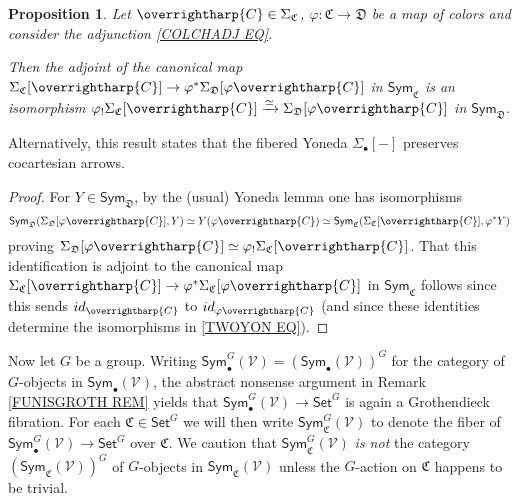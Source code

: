\documentclass[a4paper,10pt
,draft
]{article}%
\numberwithin{equation}{section}
\numberwithin{figure}{section}
\newtheorem{proposition}[equation]{Proposition}%
\theoremstyle{definition} %
\newcommand{\vect}[1]{\text{\overrightharp{\ensuremath{#1}}}}
\newcommand{\V}{\ensuremath{\mathcal V}}
\newcommand{\1}{\ensuremath{\mathbbm 1}}%
\begin{document}
\begin{proposition}\label{FIBYONPUSH PROP}
Let $\vect{C} \in \Sigma_{\mathfrak{C}}$,
$\varphi \colon \mathfrak{C} \to \mathfrak{D}$
be a map of colors and consider the adjunction \eqref{COLCHADJ EQ}.

Then the adjoint of the canonical map
$\Sigma_{\mathfrak{C}}[\vect{C}]
\to
\varphi^{\**}\Sigma_{\mathfrak{D}}[\varphi\vect{C}]$
in $\mathsf{Sym}_{\mathfrak{C}}$
is an isomorphism
$\varphi_{!} \Sigma_{\mathfrak{C}}[\vect{C}]
\xrightarrow{\simeq}
\Sigma_{\mathfrak{D}}[\varphi\vect{C}]$
in $\mathsf{Sym}_{\mathfrak{D}}$.
\end{proposition}


Alternatively, this result states that 
the fibered Yoneda $\Sigma_{\bullet}[-]$
preserves cocartesian arrows.


\begin{proof}
For $Y \in \mathsf{Sym}_{\mathfrak{D}}$, by the (usual) Yoneda lemma one has isomorphisms
\begin{equation}\label{TWOYON EQ}
\mathsf{Sym}_{\mathfrak{D}}
(\Sigma_{\mathfrak{D}}[\varphi \vect{C}],Y)
\simeq
Y(\varphi \vect{C})
\simeq
\mathsf{Sym}_{\mathfrak{C}}(\Sigma_{\mathfrak{C}}[\vect{C}],\varphi^{\**}Y)
\end{equation}
proving 
$\Sigma_{\mathfrak{D}}[\varphi \vect{C}] \simeq \varphi_! \Sigma_{\mathfrak{C}}[\vect{C}]$.
That this identification is adjoint to the canonical map
$\Sigma_{\mathfrak{C}}[\vect{C}]
\to
\varphi^{\**}\Sigma_{\mathfrak{C}}[\varphi\vect{C}]$
in $\mathsf{Sym}_{\mathfrak{C}}$
follows since this sends
$id_{\vect{C}}$ to $id_{\varphi\vect{C}}$
(and since these identities determine the isomorphisms in \eqref{TWOYON EQ}).
\end{proof}



Now let $G$ be a group. Writing 
$\mathsf{Sym}^G_\bullet(\mathcal{V})
=
\left(\mathsf{Sym}_\bullet(\mathcal{V})\right)^G$
for the category of $G$-objects
in $\mathsf{Sym}_{\bullet}(\V)$,
the abstract nonsense argument in Remark \ref{FUNISGROTH REM}
yields that
$\mathsf{Sym}^G_\bullet(\mathcal{V}) \to \mathsf{Set}^G$
is again a Grothendieck fibration.
For each $\mathfrak{C} \in \mathsf{Set}^G$
we will then write
$\mathsf{Sym}^G_{\mathfrak{C}}(\V)$
to denote the fiber of
$\mathsf{Sym}^G_\bullet(\mathcal{V}) \to \mathsf{Set}^G$
over $\mathfrak{C}$.
We caution that 
$\mathsf{Sym}^G_{\mathfrak{C}}(\V)$
\emph{is not}
the category 
$\left(\mathsf{Sym}_{\mathfrak{C}}(\V)\right)^G$
of $G$-objects in $\mathsf{Sym}_{\mathfrak{C}}(\V)$
unless the $G$-action on $\mathfrak{C}$
happens to be trivial.
\end{document}
